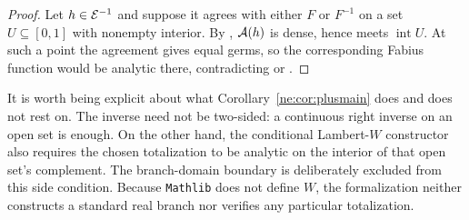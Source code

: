 \begin{proof}
Let $h\in\mathcal E^{-1}$ and suppose it agrees with either $F$ or $F^{-1}$ on a
set $U\subseteq[0,1]$ with nonempty interior.  By
, $\mathcal A(h)$ is dense, hence meets
$\operatorname{int}U$.  At such a point the agreement gives equal germs, so
the corresponding Fabius function would be analytic there, contradicting
 or .
\end{proof}

\begin{boxedremark}
It is worth being explicit about what Corollary~\ref{ne:cor:plusmain} does and does
not rest on.  The inverse need not be two-sided: a continuous right inverse on
an open set is enough.  On the other hand, the conditional Lambert-$W$
constructor also requires the chosen totalization to be analytic on the
interior of that open set's complement.  The branch-domain boundary is
deliberately excluded from this side condition.  Because \texttt{Mathlib} does
not define $W$, the formalization neither constructs a standard real branch
nor verifies any particular totalization.
\end{boxedremark}
